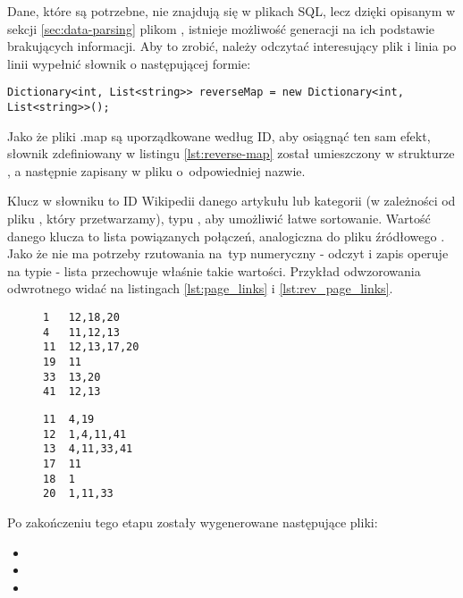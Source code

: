 Dane, które są potrzebne, nie znajdują się w plikach SQL, lecz dzięki opisanym w sekcji \ref{sec:data-parsing} plikom , istnieje możliwość generacji na ich podstawie brakujących informacji. Aby to zrobić, należy odczytać interesujący plik  i linia po linii wypełnić słownik o następującej formie:

\begin{lstlisting}[caption={Słownik przechowujący odwzorowanie odwrotne}, label=lst:reverse-map]
Dictionary<int, List<string>> reverseMap = new Dictionary<int, List<string>>();
\end{lstlisting}

Jako że pliki .map są uporządkowane według ID, aby osiągnąć ten sam efekt, słownik zdefiniowany w listingu \ref{lst:reverse-map} został umieszczony w strukturze , a następnie zapisany w pliku o~odpowiedniej nazwie. 

Klucz w słowniku to ID Wikipedii danego artykułu lub kategorii (w zależności od pliku , który przetwarzamy), typu , aby umożliwić łatwe sortowanie. Wartość danego klucza to lista powiązanych połączeń, analogiczna do pliku źródłowego . Jako że nie ma potrzeby rzutowania na~typ numeryczny - odczyt i zapis operuje na typie  - lista przechowuje właśnie takie wartości. Przykład odwzorowania odwrotnego widać na listingach \ref{lst:page_links} i \ref{lst:rev_page_links}.

\begin{figure}[!h]
\begin{center}
    \begin{minipage}[c]{0.45\linewidth}
        \begin{lstlisting}[frame=single,caption={Przykładowy fragment pliku \lstinline{pagelinks.map}},label=lst:page_links]
1   12,18,20
4   11,12,13
11  12,13,17,20
19  11
33  13,20
41  12,13
\end{lstlisting}
    \end{minipage}
    \hspace{1em}
    \begin{minipage}[c]{0.45\linewidth}
        \begin{lstlisting}[frame=single,caption={Odwzorowanie odwrotne z listingu \ref{lst:page_links} (fragment \lstinline{R\_pagelinks.map})},label=lst:rev_page_links]
11  4,19
12  1,4,11,41
13  4,11,33,41
17  11
18  1
20  1,11,33
\end{lstlisting}
\end{minipage}
\end{center}
\end{figure}
Po zakończeniu tego etapu zostały wygenerowane następujące pliki:
\begin{itemize}
    \setlength\itemsep{0.2em}
    \item {}
    \item {}
    \item {}
\end{itemize}

